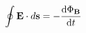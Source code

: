 \documentclass[preview]{standalone}
\begin{document}
\begin{align*}
\oint \mathbf{E} \cdot d\mathbf{s} = - \dv{\Phi_{\mathbf{B}}}{t}
\end{align*}
\end{document}
